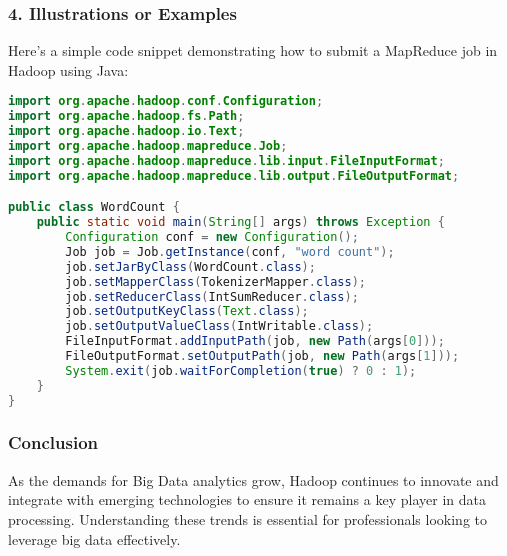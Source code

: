 \documentclass[aspectratio=169]{beamer}
\begin{document}
\begin{frame}[fragile]
  \frametitle{4. Illustrations or Examples}
  Here’s a simple code snippet demonstrating how to submit a MapReduce job in Hadoop using Java:

  \begin{lstlisting}[language=Java]
import org.apache.hadoop.conf.Configuration;
import org.apache.hadoop.fs.Path;
import org.apache.hadoop.io.Text;
import org.apache.hadoop.mapreduce.Job;
import org.apache.hadoop.mapreduce.lib.input.FileInputFormat;
import org.apache.hadoop.mapreduce.lib.output.FileOutputFormat;

public class WordCount {
    public static void main(String[] args) throws Exception {
        Configuration conf = new Configuration();
        Job job = Job.getInstance(conf, "word count");
        job.setJarByClass(WordCount.class);
        job.setMapperClass(TokenizerMapper.class);
        job.setReducerClass(IntSumReducer.class);
        job.setOutputKeyClass(Text.class);
        job.setOutputValueClass(IntWritable.class);
        FileInputFormat.addInputPath(job, new Path(args[0]));
        FileOutputFormat.setOutputPath(job, new Path(args[1]));
        System.exit(job.waitForCompletion(true) ? 0 : 1);
    }
}
  \end{lstlisting}
\end{frame}

\begin{frame}
  \frametitle{Conclusion}
  As the demands for Big Data analytics grow, Hadoop continues to innovate and integrate with emerging technologies to ensure it remains a key player in data processing. Understanding these trends is essential for professionals looking to leverage big data effectively.
\end{frame}
\end{document}
